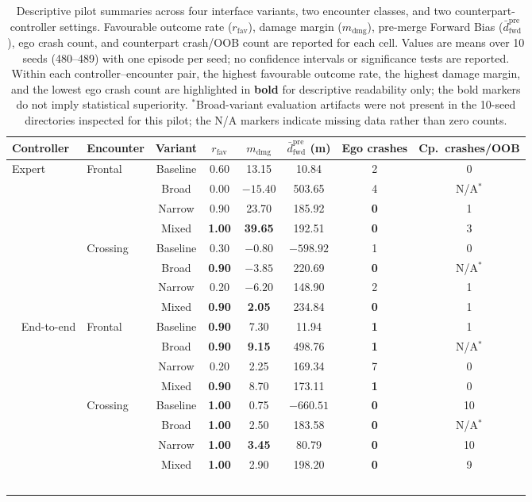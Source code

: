 \documentclass[drones,article,submit,pdftex,moreauthors]{Definitions/mdpi}
\begin{document}
\begin{table}[t]
\centering
\caption{Descriptive pilot summaries across four interface variants, two encounter classes, and two counterpart-controller settings. Favourable outcome rate ($r_{\mathrm{fav}}$), damage margin ($m_{\mathrm{dmg}}$), pre-merge Forward Bias ($\bar{d}_{\mathrm{fwd}}^{\mathrm{pre}}$), ego crash count, and counterpart crash/OOB count are reported for each cell. Values are means over 10 seeds (480--489) with one episode per seed; no confidence intervals or significance tests are reported. Within each controller--encounter pair, the highest favourable outcome rate, the highest damage margin, and the lowest ego crash count are highlighted in \textbf{bold} for descriptive readability only; the bold markers do not imply statistical superiority. $^*$Broad-variant evaluation artifacts were not present in the 10-seed directories inspected for this pilot; the N/A markers indicate missing data rather than zero counts.}
\label{tab:main_results}
\begin{tabular}{@{}llcccccc@{}}
\toprule
Controller & Encounter & Variant & $r_{\mathrm{fav}}$ & $m_{\mathrm{dmg}}$ & $\bar{d}_{\mathrm{fwd}}^{\mathrm{pre}}$ (m) & Ego crashes & Cp.~crashes/OOB \\
\midrule
Expert & Frontal & Baseline & 0.60 & 13.15 & 10.84 & 2 & 0 \\\
& & Broad & 0.00 & $-15.40$ & 503.65 & 4 & N/A$^*$ \\\
& & Narrow & 0.90 & 23.70 & 185.92 & \textbf{0} & 1 \\\
& & Mixed & \textbf{1.00} & \textbf{39.65} & 192.51 & \textbf{0} & 3 \\\
\cmidrule{2-8}
& Crossing & Baseline & 0.30 & $-0.80$ & $-598.92$ & 1 & 0 \\\
& & Broad & \textbf{0.90} & $-3.85$ & 220.69 & \textbf{0} & N/A$^*$ \\\
& & Narrow & 0.20 & $-6.20$ & 148.90 & 2 & 1 \\\
& & Mixed & \textbf{0.90} & \textbf{2.05} & 234.84 & \textbf{0} & 1 \\\
\midrule
End-to-end & Frontal & Baseline & \textbf{0.90} & 7.30 & 11.94 & \textbf{1} & 1 \\\
& & Broad & \textbf{0.90} & \textbf{9.15} & 498.76 & \textbf{1} & N/A$^*$ \\\
& & Narrow & 0.20 & 2.25 & 169.34 & 7 & 0 \\\
& & Mixed & \textbf{0.90} & 8.70 & 173.11 & \textbf{1} & 0 \\\
\cmidrule{2-8}
& Crossing & Baseline & \textbf{1.00} & 0.75 & $-660.51$ & \textbf{0} & 10 \\\
& & Broad & \textbf{1.00} & 2.50 & 183.58 & \textbf{0} & N/A$^*$ \\\
& & Narrow & \textbf{1.00} & \textbf{3.45} & 80.79 & \textbf{0} & 10 \\\
& & Mixed & \textbf{1.00} & 2.90 & 198.20 & \textbf{0} & 9 \\\
\bottomrule
\end{tabular}
\end{table}
\end{document}
